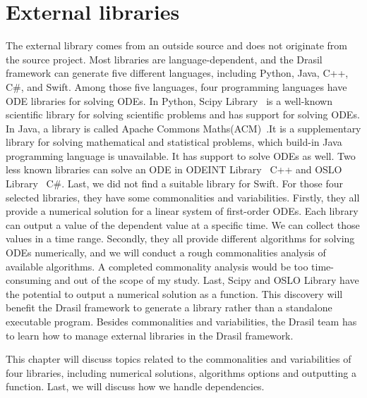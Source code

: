 \chapter{External libraries}
The external library comes from an outside source and does not originate from the source project. Most libraries are language-dependent, and the Drasil framework can generate five different languages, including Python, Java, C++, C\#, and Swift. Among those five languages, four programming languages have ODE libraries for solving ODEs. In Python, Scipy Library~\citep{scipy} is a well-known scientific library for solving scientific problems and has support for solving ODEs. In Java, a library is called Apache Commons Maths(ACM)~\citep{apache}.It is a supplementary library for solving mathematical and statistical problems, which build-in Java programming language is unavailable. It has support to solve ODEs as well. Two less known libraries can solve an ODE in ODEINT Library~\citep{odeint} C++ and OSLO Library~\citep{oslo} C\#. Last, we did not find a suitable library for Swift. For those four selected libraries, they have some commonalities and variabilities. Firstly, they all provide a numerical solution for a linear system of first-order ODEs. Each library can output a value of the dependent value at a specific time. We can collect those values in a time range. Secondly, they all provide different algorithms for solving ODEs numerically, and we will conduct a rough commonalities analysis of available algorithms. A completed commonality analysis would be too time-consuming and out of the scope of my study. Last, Scipy and OSLO Library have the potential to output a numerical solution as a function. This discovery will benefit the Drasil framework to generate a library rather than a standalone executable  program. Besides commonalities and variabilities, the Drasil team has to learn how to manage external libraries in the Drasil framework.

This chapter will discuss topics related to the commonalities and variabilities of four libraries, including numerical solutions, algorithms options and outputting a function. Last, we will discuss how we handle dependencies.

